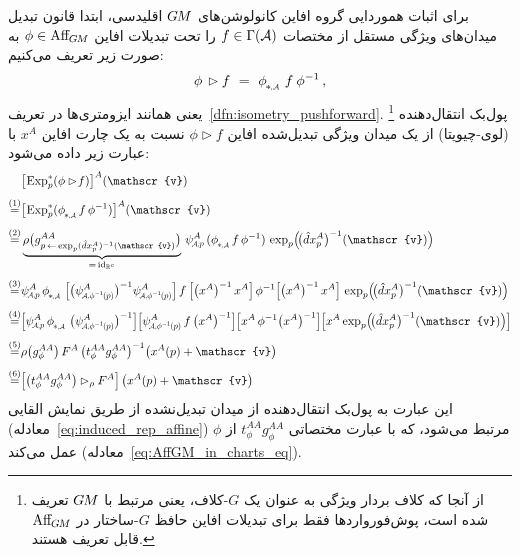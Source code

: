 برای اثبات هموردایی گروه افاین کانولوشن‌های $G\mkern-1.4muM$ اقلیدسی، ابتدا قانون تبدیل میدان‌های ویژگی مستقل از مختصات $f\in \Gamma(\mathcal{A})$ را تحت تبدیلات افاین $\phi \in \operatorname{Aff}_{\mkern-2muG\mkern-1.4muM}$ به صورت زیر تعریف می‌کنیم:
\begin{align}\label{eq:affine_action_sections}
	\phi \,\rhd f\ =\ \dphiA\, f\: \phi^{-1} \,,
\end{align}
یعنی همانند ایزومتری‌ها در تعریف~\ref{dfn:isometry_pushforward}.%
\footnote{
	از آنجا که کلاف بردار ویژگی به عنوان یک $G$-کلاف، یعنی مرتبط با $G\mkern-1.4muM$ تعریف شده است، پوش‌فورواردها فقط برای تبدیلات افاین حافظ $G$-ساختار در $\operatorname{Aff}_{\mkern-2muG\mkern-1.4muM}$ قابل تعریف هستند.
}
پول‌بک انتقال‌دهنده (لوی-چیویتا) از یک میدان ویژگی تبدیل‌شده افاین $\phi \rhd\! f$ نسبت به یک چارت افاین $x^A$ با عبارت زیر داده می‌شود:
\begin{align}\label{eq:affine_transformed_transporter_pullback}
	& \big[\mkern-2mu \Expsp (\phi \rhd\! f) \big]^A (\mathscr{v})
	\notag \\[.8ex]
	\overset{(1)}{=}& 
	\big[\mkern-2mu \Expsp (\dphiA f\, \phi^{-1}) \big]^A (\mathscr{v})
	\notag \\[.8ex]
	\overset{(2)}{=}& 
	\underbrace{\rho\big( g^{AA}_{p \,\leftarrow\, \exp_p (\hat{d}x_p^A)^{-1}(\mathscr{v})} \big)}_{=\, \id_{\R^c}} \,
	\psiAp^A\, (\dphiA f\, \phi^{-1})\,
	\exp_p \!\pig(\! \big(\hat{d}x_p^A \big)^{-1}(\mathscr{v}) \pig)
	\notag \\[.8ex]
	\overset{(3)}{=}& 
	\psiAp^A\, \dphiA\,
	\pig[ \big( \psiAphiinvp^A \big)^{-1} \psiAphiinvp^A\pig]\, 
	f\: 
	\pig[ \big(x^A \big)^{-1}\, x^A\pig]\, 
	\phi^{-1} 
	\pig[ \big(x^A \big)^{-1}\, x^A\pig]\, 
	\exp_p \!\pig(\! \big(\hat{d}x_p^A \big)^{-1}(\mathscr{v}) \pig)
	\notag \\[.8ex]
	\overset{(4)}{=}& 
	\pig[\psiAp^A\, \dphiA\, \big(\psiAphiinvp^A \big)^{-1}\pig]
	\pig[\psiAphiinvp^A\, f\, \big(x^A \big)^{-1}\pig]
	\pig[x^A\, \phi^{-1} \big(x^A \big)^{-1}\pig]
	\pig[x^A \exp_p \!\pig(\! \big(\hat{d}x_p^A \big)^{-1}(\mathscr{v}) \pig) \pig]
	\notag \\[.8ex]
	\overset{(5)}{=}& 
	\rho\big( g_\phi^{AA} \big)\, F^A\, \big( t_\phi^{AA} g_\phi^{AA} \big)^{-1} \big(x^A(p) + \mathscr{v} \big)
	\notag \\[.8ex]
	\overset{(6)}{=}& 
	\pig[\big( t_\phi^{AA} g_\phi^{AA} \big) \rhd_\rho F^A \pig]\, \big(x^A(p) + \mathscr{v} \big)
\end{align}
این عبارت به پول‌بک انتقال‌دهنده از میدان تبدیل‌نشده از طریق نمایش القایی (معادله~\eqref{eq:induced_rep_affine}) مرتبط می‌شود، که با عبارت مختصاتی $t_\phi^{AA} g_\phi^{AA}$ از $\phi$ عمل می‌کند (معادله~\eqref{eq:AffGM_in_charts_eq}).
